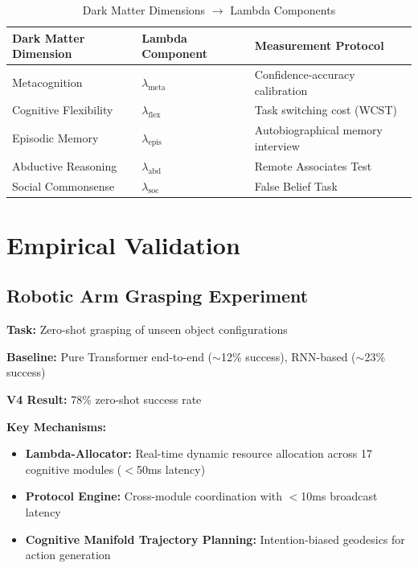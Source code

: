 \documentclass[11pt,a4paper]{article}
\theoremstyle{definition}
\theoremstyle{remark}
\newcommand{\CAA}{\text{CAA-X}}
\newcommand{\GWP}{\text{GWP}}
\begin{document}
\begin{table}[htbp]
\centering
\caption{Dark Matter Dimensions $\rightarrow$ Lambda Components}
\label{tab:dark-matter}
\begin{tabular}{lll}
\toprule
\textbf{Dark Matter Dimension} & \textbf{Lambda Component} & \textbf{Measurement Protocol} \\
\midrule
Metacognition & $\lambda_{\text{meta}}$ & Confidence-accuracy calibration \\
Cognitive Flexibility & $\lambda_{\text{flex}}$ & Task switching cost (WCST) \\
Episodic Memory & $\lambda_{\text{epis}}$ & Autobiographical memory interview \\
Abductive Reasoning & $\lambda_{\text{abd}}$ & Remote Associates Test \\
Social Commonsense & $\lambda_{\text{soc}}$ & False Belief Task \\
\bottomrule
\end{tabular}
\end{table}

\section{Empirical Validation}\label{sec:validation}

\subsection{Robotic Arm Grasping Experiment}\label{subsec:robotic-arm}

\textbf{Task:} Zero-shot grasping of unseen object configurations

\textbf{Baseline:} Pure Transformer end-to-end ($\sim$12\% success), RNN-based ($\sim$23\% success)

\textbf{\CAA{} V4 Result:} 78\% zero-shot success rate

\textbf{Key Mechanisms:}
\begin{itemize}
    \item \textbf{Lambda-Allocator:} Real-time dynamic resource allocation across 17 cognitive modules ($<$50ms latency)
    \item \textbf{\GWP{} Protocol Engine:} Cross-module coordination with $<$10ms broadcast latency
    \item \textbf{Cognitive Manifold Trajectory Planning:} Intention-biased geodesics for action generation
\end{itemize}
\end{document}
